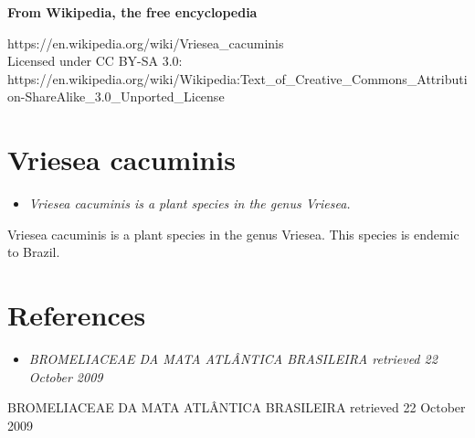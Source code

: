 \textbf{From Wikipedia, the free encyclopedia}

https://en.wikipedia.org/wiki/Vriesea\_cacuminis\\
Licensed under CC BY-SA 3.0:\\
https://en.wikipedia.org/wiki/Wikipedia:Text\_of\_Creative\_Commons\_Attribution-ShareAlike\_3.0\_Unported\_License

\section{Vriesea cacuminis}\label{vriesea-cacuminis}

\begin{itemize}
\item
  \emph{Vriesea cacuminis is a plant species in the genus Vriesea.}
\end{itemize}

Vriesea cacuminis is a plant species in the genus Vriesea. This species
is endemic to Brazil.

\section{References}\label{references}

\begin{itemize}
\item
  \emph{BROMELIACEAE DA MATA ATLÂNTICA BRASILEIRA retrieved 22 October
  2009}
\end{itemize}

BROMELIACEAE DA MATA ATLÂNTICA BRASILEIRA retrieved 22 October 2009
